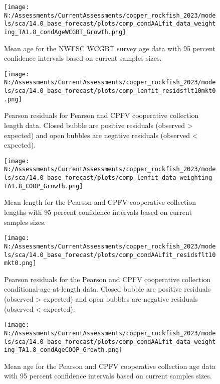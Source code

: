 \documentclass[11pt,
  english,
  letterpaper,
]{article}
\begin{document}
\pagebreak

\begin{figure}
\centering
\texttt{[image: N:/Assessments/CurrentAssessments/copper\_rockfish\_2023/models/sca/14.0\_base\_forecast/plots/comp\_condAALfit\_data\_weighting\_TA1.8\_condAgeWCGBT\_Growth.png]}
\caption{Mean age for the NWFSC WCGBT survey age data with 95 percent confidence intervals based on current samples sizes.\label{fig:wcgbt-mean-age-fit}}
\end{figure}

\pagebreak

\begin{figure}
\centering
\texttt{[image: N:/Assessments/CurrentAssessments/copper\_rockfish\_2023/models/sca/14.0\_base\_forecast/plots/comp\_lenfit\_residsflt10mkt0.png]}
\caption{Pearson residuals for Pearson and CPFV cooperative collection length data. Closed bubble are positive residuals (observed \textgreater{} expected) and open bubbles are negative residuals (observed \textless{} expected).\label{fig:coop-len-pearson}}
\end{figure}

\pagebreak

\begin{figure}
\centering
\texttt{[image: N:/Assessments/CurrentAssessments/copper\_rockfish\_2023/models/sca/14.0\_base\_forecast/plots/comp\_lenfit\_data\_weighting\_TA1.8\_COOP\_Growth.png]}
\caption{Mean length for the Pearson and CPFV cooperative collection lengths with 95 percent confidence intervals based on current samples sizes.\label{fig:coop-mean-len-fit}}
\end{figure}

\pagebreak

\begin{figure}
\centering
\texttt{[image: N:/Assessments/CurrentAssessments/copper\_rockfish\_2023/models/sca/14.0\_base\_forecast/plots/comp\_condAALfit\_residsflt10mkt0.png]}
\caption{Pearson residuals for the Pearson and CPFV cooperative collection conditional-age-at-length data. Closed bubble are positive residuals (observed \textgreater{} expected) and open bubbles are negative residuals (observed \textless{} expected).\label{fig:coop-age-pearson}}
\end{figure}

\pagebreak

\begin{figure}
\centering
\texttt{[image: N:/Assessments/CurrentAssessments/copper\_rockfish\_2023/models/sca/14.0\_base\_forecast/plots/comp\_condAALfit\_data\_weighting\_TA1.8\_condAgeCOOP\_Growth.png]}
\caption{Mean age for the Pearson and CPFV cooperative collection age data with 95 percent confidence intervals based on current samples sizes.\label{fig:coop-mean-age-fit}}
\end{figure}
\end{document}
